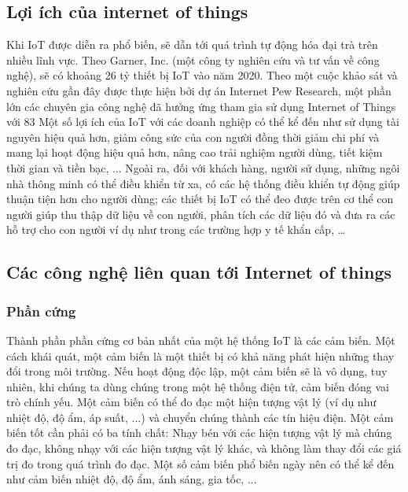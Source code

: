 \subsection{Lợi ích của internet of things}
Khi IoT được diễn ra phổ biến, sẽ dẫn tới quá trình tự động hóa đại trà trên nhiều lĩnh vực. Theo Garner, Inc.  (một công ty nghiên cứu và tư vấn về công nghệ), sẽ có khoảng 26 tỷ thiết bị IoT vào năm 2020. Theo một cuộc khảo sát và nghiên cứu gần đây được thực hiện bởi dự án Internet Pew Research, một phần lớn các chuyên gia công nghệ đã hưởng ứng tham gia sử dụng Internet of Things với 83%
Một số lợi ích của IoT với các doanh nghiệp có thể kể đến như sử dụng tài nguyên hiệu quả hơn, giảm công sức của con người đồng thời giảm chi phí và mang lại hoạt động hiệu quả hơn, nâng cao trải nghiệm người dùng, tiết kiệm thời gian và tiền bạc, ... Ngoài ra, đối với khách hàng, người sử dụng, những ngôi nhà thông minh có thể điều khiển từ xa, có các hệ thống điều khiển tự động giúp thuận tiện hơn cho người dùng; các thiết bị IoT có thể đeo được trên cơ thể con người giúp thu thập dữ liệu về con người, phân tích các dữ liệu đó và đưa ra các hỗ trợ cho con người ví dụ như trong các trường hợp y tế khẩn cấp, …

\subsection{Các công nghệ liên quan tới Internet of things}
\subsubsection{Phần cứng}

Thành phần phần cứng cơ bản nhất của một hệ thống IoT là các cảm biến. Một cách khái quát, một cảm biến là một thiết bị có khả năng phát hiện những thay đổi trong môi trường. Nếu hoạt động độc lập, một cảm biến sẽ là vô dụng, tuy nhiên, khi chúng ta dùng chúng trong một hệ thống điện tử, cảm biến đóng vai trò chính yếu. Một cảm biến  có thể đo đạc một hiện tượng vật lý (ví dụ như nhiệt độ, độ ẩm, áp suất, ...) và chuyển chúng thành các tín hiệu điện. Một cảm biến tốt cần phải có ba tính chất: Nhạy bén với các hiện tượng vật lý mà chúng đo đạc, không nhạy với các hiện tượng vật lý khác, và không làm thay đổi các giá trị đo trong quá trình đo đạc. Một số cảm biến phổ biến ngày nên có thể kể đến như cảm biến nhiệt độ, độ ẩm, ánh sáng, gia tốc, ... 

